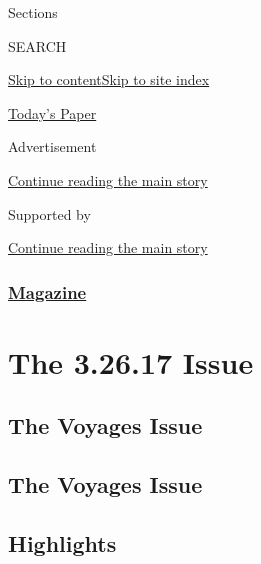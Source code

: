 Sections

SEARCH

\protect\hyperlink{site-content}{Skip to
content}\protect\hyperlink{site-index}{Skip to site index}

\href{https://myaccount.nytimes3xbfgragh.onion/auth/login?response_type=cookie\&client_id=vi}{}

\href{https://www.nytimes3xbfgragh.onion/section/todayspaper}{Today's
Paper}

Advertisement

\protect\hyperlink{after-top}{Continue reading the main story}

Supported by

\protect\hyperlink{after-sponsor}{Continue reading the main story}

\hypertarget{magazine}{%
\subsubsection{\texorpdfstring{\href{/section/magazine}{Magazine}}{Magazine}}\label{magazine}}

\hypertarget{the-32617-issue}{%
\section{The 3.26.17 Issue}\label{the-32617-issue}}

\hypertarget{the-voyages-issue}{%
\subsection{The Voyages Issue}\label{the-voyages-issue}}

\hypertarget{the-voyages-issue-1}{%
\subsection{The Voyages Issue}\label{the-voyages-issue-1}}

\hypertarget{highlights}{%
\subsection{Highlights}\label{highlights}}

